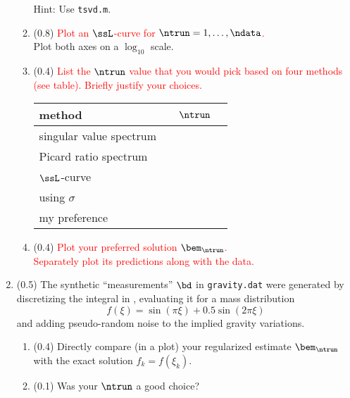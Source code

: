 \documentclass[11pt,titlepage,fleqn]{article}
\newcommand{\mv}{\xi}  %
\begin{document}
\begin{enumerate}
\begin{enumerate}
Hint: Use \verb+tsvd.m+.

\item (0.8) \textcolor{red}{Plot an $\ssL$-curve \citep[][p.~95]{AsterE2} for $\ntrun = 1,\ldots,\ndata$.} \\
Plot both axes on a $\log_{10}$ scale.

\item (0.4) \textcolor{red}{List the $\ntrun$ value that you would pick based on four methods (see table). Briefly justify your choices.}

\begin{center}
\begin{tabular}{l|l}
\hline
method & $\;\;\;\;\ntrun\;\;\;\;$ \\ \hline\hline
singular value spectrum & \\ \hline
Picard ratio spectrum & \\ \hline
$\ssL$-curve & \\ \hline
using $\sigma$ \\ \hline
my preference \\ \hline
\end{tabular}
\end{center}

\item (0.4) \textcolor{red}{Plot your preferred solution $\bem_{\ntrun}$. \\
Separately plot its predictions along with the data.}

\end{enumerate}
\label{prob2}


\item (0.5) The synthetic ``measurements'' $\bd$ in \verb+gravity.dat+ were generated by discretizing the integral in , evaluating it for a mass distribution 
%
\begin{equation}
f(\mv) = \sin(\pi\mv) + 0.5 \sin(2\pi\mv)
\end{equation}
%
and adding pseudo-random noise to the implied gravity variations.

\begin{enumerate}
\item (0.4) Directly compare (in a plot) your regularized estimate $\bem_{\ntrun}$ with the exact solution $f_k = f(\mv_k)$.
\item (0.1) Was your $\ntrun$ a good choice?
\end{enumerate}

\end{enumerate}
\end{document}
